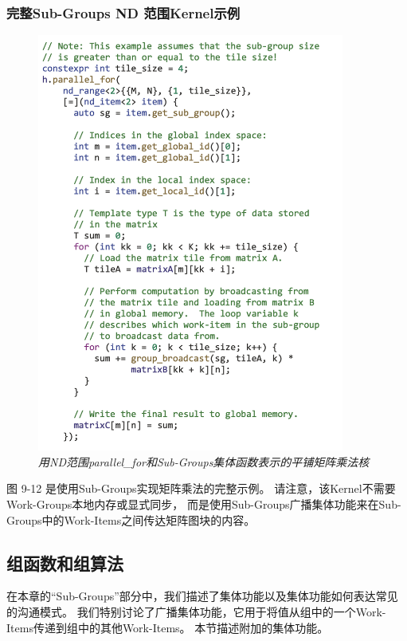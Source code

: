 \subsubsection{完整Sub-Groups ND 范围Kernel示例}
\begin{figure}[H]
	\centering
	\includegraphics[width=0.9\textwidth]{figs/F9.12.png}
	\caption{\textit{用ND范围parallel\_for和Sub-Groups集体函数表示的平铺矩阵乘法核 }}
\end{figure}

图 9-12 是使用Sub-Groups实现矩阵乘法的完整示例。 
请注意，该Kernel不需要Work-Groups本地内存或显式同步，
而是使用Sub-Groups广播集体功能来在Sub-Groups中的Work-Items之间传达矩阵图块的内容。

\subsection{组函数和组算法}
在本章的“Sub-Groups”部分中，我们描述了集体功能以及集体功能如何表达常见的沟通模式。 
我们特别讨论了广播集体功能，它用于将值从组中的一个Work-Items传递到组中的其他Work-Items。 本节描述附加的集体功能。

